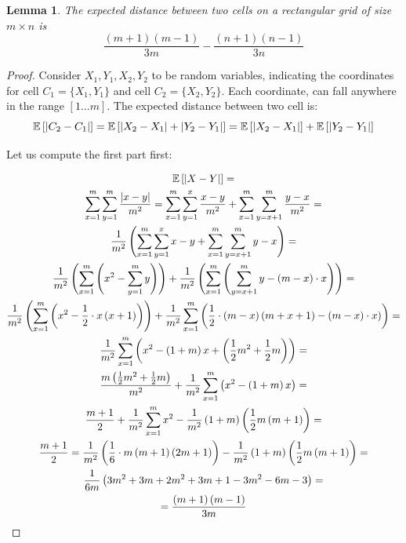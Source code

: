 \documentclass[a4paper,10pt]{article}
\newtheorem{lemma}[theorem]{Lemma}
\DeclarePairedDelimiter\abs{\lvert}{\rvert}%
\begin{document}
\begin{lemma}\label{lemmas:ExpectedDistanceTwoCellsRectangular}
The expected distance between two cells on a rectangular grid of size $m\times n$ is \[\frac{\left(m+1\right)\left(m-1\right)}{3m}-\frac{\left(n+1\right)\left(n-1\right)}{3n}\] 
\end{lemma}
\begin{proof}
Consider $X_1,Y_1,X_2,Y_2$ to be random variables, indicating the coordinates for cell $C_1=\lbrace X_1, Y_1 \rbrace$ and  cell $C_2=\lbrace X_2, Y_2 \rbrace$. Each coordinate, can fall anywhere in the range $\left[1\ldots m\right]$.
The expected distance between two cell is:
\[\mathbb{E}\left[\abs*{C_2-C_1}\right]=\mathbb{E}\left[\abs*{X_2-X_1} + \abs*{Y_2-Y_1}\right]=\mathbb{E}\left[\abs*{X_2-X_1}\right]+\mathbb{E}\left[\abs*{Y_2-Y_1}\right]\]

Let us compute the first part first:

\begin{multline*}
\mathbb{E}\left[\abs*{X-Y}\right] = \\
\sum_{x=1}^{m}\sum_{y=1}^{m}{\frac{\abs*{x-y}}{m^2}} = \sum_{x=1}^{m}\sum_{y=1}^{x}{\frac{x-y}{m^2}}+\sum_{x=1}^{m}\sum_{y=x+1}^{m}{\frac{y-x}{m^2}}=\\
\frac{1}{m^2}\left(\sum_{x=1}^{m}\sum_{y=1}^{x}{x-y}+\sum_{x=1}^{m}\sum_{y=x+1}^{m}{y-x}\right)=\\
\frac{1}{m^2}\left(\sum_{x=1}^{m}{\left(x^2-\sum_{y=1}^{m}{y}\right)}\right)+
\frac{1}{m^2}\left(\sum_{x=1}^{m}\left(\sum_{y=x+1}^{m}{y}-\left(m-x\right)\cdot x\right)\right)=\\
\frac{1}{m^2}\left(\sum_{x=1}^{m}{\left(x^2-\frac{1}{2}\cdot x\left(x+1\right)\right)}\right)+
\frac{1}{m^2}\sum_{x=1}^{m}\left(\frac{1}{2}\cdot \left(m-x\right)\left(m+x+1)-\left(m-x\right)\cdot x\right)\right)=\\
\frac{1}{m^2}\sum_{x=1}^{m}{\left(x^2-\left(1+m\right)x+\left(\frac{1}{2}m^2+\frac{1}{2}m\right)\right)}=\\
\frac{m\left(\frac{1}{2}m^2+\frac{1}{2}m\right)}{m^2}+\frac{1}{m^2}\sum_{x=1}^{m}{\left(x^2-\left(1+m\right)x\right)}=\\
\frac{m+1}{2}+\frac{1}{m^2}\sum_{x=1}^{m}{x^2}-\frac{1}{m^2}\left(1+m\right)\left(\frac{1}{2}m\left(m+1\right)\right)=\\
\frac{m+1}{2}=\frac{1}{m^2}\left(\frac{1}{6}\cdot m\left(m+1\right)\left(2m+1\right)\right)-
\frac{1}{m^2}\left(1+m\right)\left(\frac{1}{2}m\left(m+1\right)\right)=\\
\frac{1}{6m}\left(3m^2+3m+2m^2+3m+1-3m^2-6m-3\right)=\\
=\frac{\left(m+1\right)\left(m-1\right)}{3m}
\end{multline*}


\end{proof}
\end{document}
